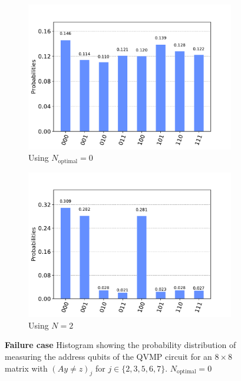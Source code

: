 \documentclass[11pt]{article}
\theoremstyle{definition}
\theoremstyle{remark}
\begin{document}
\begin{figure}[h!]
  \centering
  \begin{subfigure}{0.48\textwidth}
    \includegraphics[width=\textwidth]{../../results/figures/qvmp_functionality_pfound_known__2.pdf}
    \caption{Using $N_{\text{optimal}} = 0$}
  \end{subfigure}
  \begin{subfigure}{0.48\textwidth}
    \includegraphics[width=\textwidth]{../../results/figures/qvmp_functionality_pfound_unknown__2.pdf}
    \caption{Using $N = 2$}
  \end{subfigure}
  \caption{\textbf{Failure case} Histogram showing the probability distribution
  of measuring the address qubits of the QVMP circuit for an $8 \times 8$ matrix
  with $(Ay \neq z)_j$ for $j \in \{2, 3, 5, 6, 7\}$. $N_{\text{optimal}} = 0$}
  \label{fig:qvmp_functionality_pfound_unknown__2}
\end{figure}
\end{document}
